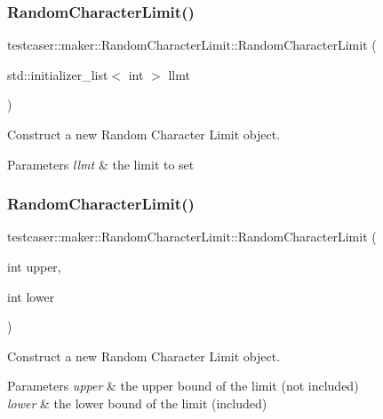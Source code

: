 \subsubsection{\texorpdfstring{RandomCharacterLimit()}{RandomCharacterLimit()}\hspace{0.1cm}{\footnotesize\ttfamily [1/2]}}
{\footnotesize\ttfamily testcaser\+::maker\+::\+Random\+Character\+Limit\+::\+Random\+Character\+Limit (\begin{DoxyParamCaption}\item[{std\+::initializer\+\_\+list$<$ int $>$}]{llmt }\end{DoxyParamCaption})\hspace{0.3cm}{\ttfamily [inline]}}



Construct a new Random Character Limit object. 


\begin{DoxyParams}{Parameters}
{\em llmt} & the limit to set \\
\hline
\end{DoxyParams}
\mbox{\label{structtestcaser_1_1maker_1_1RandomCharacterLimit_a7a85c6420ec09f97e648f516a9bb68fd}} 
\subsubsection{\texorpdfstring{RandomCharacterLimit()}{RandomCharacterLimit()}\hspace{0.1cm}{\footnotesize\ttfamily [2/2]}}
{\footnotesize\ttfamily testcaser\+::maker\+::\+Random\+Character\+Limit\+::\+Random\+Character\+Limit (\begin{DoxyParamCaption}\item[{int}]{upper,  }\item[{int}]{lower }\end{DoxyParamCaption})\hspace{0.3cm}{\ttfamily [inline]}}



Construct a new Random Character Limit object. 


\begin{DoxyParams}{Parameters}
{\em upper} & the upper bound of the limit (not included) \\
\hline
{\em lower} & the lower bound of the limit (included) \\
\hline
\end{DoxyParams}


